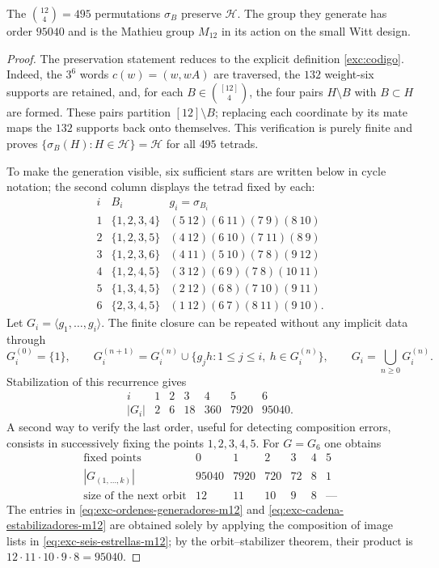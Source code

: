 \begin{proposition}
\label{exc:m12}
The $\binom{12}4=495$ permutations $\sigma_B$ preserve $\mathcal H$.
The group they generate has order $95040$ and is the Mathieu group
$M_{12}$ in its action on the small Witt design.
\end{proposition}

\begin{proof}
The preservation statement reduces to the explicit definition
\eqref{exc:codigo}. Indeed, the $3^6$ words $c(w)=(w,wA)$ are traversed,
the $132$ weight-six supports are retained, and, for each
$B\in\binom{[12]}4$, the four pairs $H\setminus B$ with $B\subset H$ are
formed. These pairs partition $[12]\setminus B$; replacing each coordinate
by its mate maps the $132$ supports back onto themselves. This verification
is purely finite and proves
\(\{\sigma_B(H):H\in\mathcal H\}=\mathcal H\) for all $495$ tetrads.

To make the generation visible, six sufficient stars are written below in
cycle notation; the second column displays the tetrad fixed by each:
\[
\begin{array}{c|c|l}
i&B_i&g_i=\sigma_{B_i}\\ \hline
1&\{1,2,3,4\}&(5\ 12)(6\ 11)(7\ 9)(8\ 10)\\
2&\{1,2,3,5\}&(4\ 12)(6\ 10)(7\ 11)(8\ 9)\\
3&\{1,2,3,6\}&(4\ 11)(5\ 10)(7\ 8)(9\ 12)\\
4&\{1,2,4,5\}&(3\ 12)(6\ 9)(7\ 8)(10\ 11)\\
5&\{1,3,4,5\}&(2\ 12)(6\ 8)(7\ 10)(9\ 11)\\
6&\{2,3,4,5\}&(1\ 12)(6\ 7)(8\ 11)(9\ 10).
\end{array}
\tag{M12.1}
\label{eq:exc-seis-estrellas-m12}
\]
Let $G_i=\langle g_1,\ldots,g_i\rangle$. The finite closure can be repeated
without any implicit data through
\[
 G_i^{(0)}=\{1\},\qquad
 G_i^{(n+1)}=G_i^{(n)}\cup
 \{g_jh:1\leq j\leq i,\ h\in G_i^{(n)}\},\qquad
 G_i=\bigcup_{n\geq0}G_i^{(n)}.
\tag{M12.2}
\label{eq:exc-clausura-finita-m12}
\]
Stabilization of this recurrence gives
\[
\begin{array}{c|rrrrrr}
i&1&2&3&4&5&6\\ \hline
|G_i|&2&6&18&360&7920&95040.
\end{array}
\tag{M12.3}
\label{eq:exc-ordenes-generadores-m12}
\]
A second way to verify the last order, useful for detecting composition
errors, consists in successively fixing the points $1,2,3,4,5$. For $G=G_6$
one obtains
\[
\begin{array}{c|rrrrrr}
\text{fixed points}&0&1&2&3&4&5\\ \hline
|G_{(1,\ldots,k)}|&95040&7920&720&72&8&1\\
\text{size of the next orbit}&12&11&10&9&8&\text{---}
\end{array}
\tag{M12.4}
\label{eq:exc-cadena-estabilizadores-m12}
\]
The entries in \eqref{eq:exc-ordenes-generadores-m12} and
\eqref{eq:exc-cadena-estabilizadores-m12} are obtained solely by applying
the composition of image lists in \eqref{eq:exc-seis-estrellas-m12}; by the
orbit--stabilizer theorem, their product is
$12\cdot11\cdot10\cdot9\cdot8=95040$.


\end{proof}
